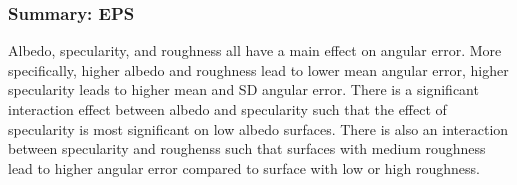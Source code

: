 \subsubsection{Summary: EPS} 
Albedo, specularity, and roughness all have a main effect on angular error. More specifically, higher albedo and roughness lead to lower mean angular error, higher specularity leads to higher mean and SD angular error. There is a significant interaction effect between albedo and specularity such that the effect of specularity is most significant on low albedo surfaces. There is also an interaction between specularity and roughenss such that surfaces with medium roughness lead to higher angular error compared to surface with low or high roughness.


